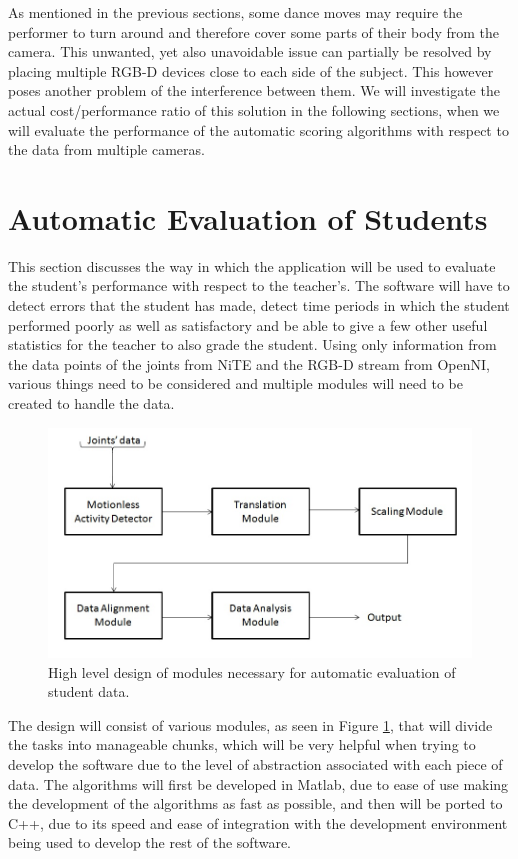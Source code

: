 \documentclass[a4paper]{article}
\begin{document}
\medskip \noindent As mentioned in the previous sections, some dance moves may require the performer to turn around and therefore cover some parts of their body from the camera. This unwanted, yet also unavoidable issue can partially be resolved by placing multiple RGB-D devices close to each side of the subject. This however poses another problem of the interference between them. We will investigate the actual cost/performance ratio of this solution in the following sections, when we will evaluate the performance of the automatic scoring algorithms with respect to the data from multiple cameras.

\clearpage

\section{Automatic Evaluation of Students}
\noindent
This section discusses the way in which the application will be used to evaluate the student's performance with respect to the teacher's. The software will have to detect errors that the student has made, detect time periods in which the student performed poorly as well as satisfactory and be able to give a few other useful statistics for the teacher to also grade the student. Using only information from the data points of the joints from NiTE and the RGB-D stream from OpenNI, various things need to be considered and multiple modules will need to be created to handle the data. 

\begin{figure}[H]
\centering
\includegraphics[scale=0.4]{data_analysis_modules.jpg}
\caption{High level design of modules necessary for automatic evaluation of student data.}
\label{modules}
\end{figure}
 
\noindent The design will consist of various modules, as seen in Figure \ref{modules}, that will divide the tasks into manageable chunks, which will be very helpful when trying to develop the software due to the level of abstraction associated with each piece of data. The algorithms will first be developed in Matlab, due to ease of use making the development of the algorithms as fast as possible, and then will be ported to C++, due to its speed and ease of integration with the development environment being used to develop the rest of the software. 
\end{document}
